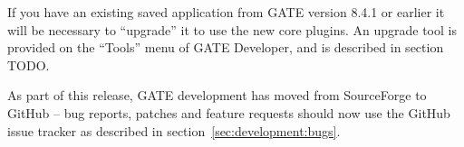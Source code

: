 If you have an existing saved application from GATE version 8.4.1 or earlier it
will be necessary to ``upgrade'' it to use the new core plugins.  An upgrade
tool is provided on the ``Tools'' menu of GATE Developer, and is described in
section TODO.


As part of this release, GATE development has moved from SourceForge to GitHub
-- bug reports, patches and feature requests should now use the GitHub issue
tracker as described in section~\ref{sec:development:bugs}.

